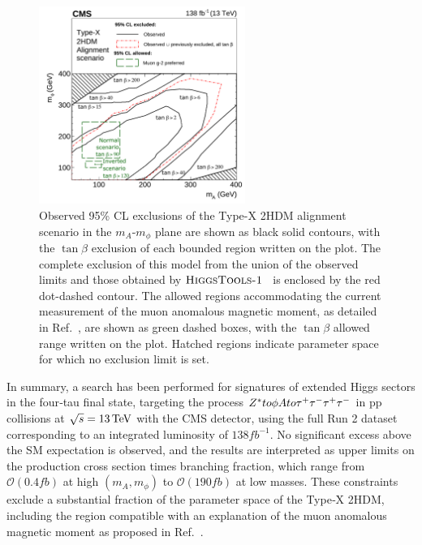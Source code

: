 \begin{figure}[!htbp]
  \centering
  \includegraphics[width=0.6\textwidth]{Figures/Chapter6/md_2d_hb_gm2_contour.pdf}
  \caption[Summary of exclusion contours in the $m_A-m_\phi$ plane.]{
   Observed 95\% CL exclusions of the Type-X \ac{2HDM} alignment scenario in the $m_A$-$m_\phi$ plane are shown as black solid contours, with the $\tan\beta$ exclusion of each bounded region written on the plot.
   The complete exclusion of this model from the union of the observed limits and those obtained by $\textsc{HiggsTools-1}$~\cite{Bahl:2022igd} is enclosed by the red dot-dashed contour.
   The allowed regions accommodating the current measurement of the muon anomalous magnetic moment, as detailed in Ref.~\cite{TypeX_2HDM}, are shown as green dashed boxes, with the $\tan\beta$ allowed range written on the plot. Hatched regions indicate parameter space for which no exclusion limit is set.
  }
  \label{Figure:Chapter6_model_dependent_2d}
\end{figure}

In summary, a search has been performed for signatures of extended Higgs sectors in the four‑tau final state, targeting the process $Z^* to \phi A to \tau^+\tau^-\tau^+\tau^-$ in pp collisions at $\sqrt{s} = 13\,\text{Te\hspace{-.08em}V}$ with the \ac{CMS} detector, using the full Run 2 dataset corresponding to an integrated luminosity of $138\unit{fb}^{-1}$. No significant excess above the \ac{SM} expectation is observed, and the results are interpreted as upper limits on the production cross section times branching fraction, which range from $\mathcal{O}(0.4\unit{fb})$ at high $(m_A, m_\phi)$ to $\mathcal{O}(190\unit{fb})$ at low masses. These constraints exclude a substantial fraction of the parameter space of the Type‑X \ac{2HDM}, including the region compatible with an explanation of the muon anomalous magnetic moment as proposed in Ref.~\cite{TypeX_2HDM}.










